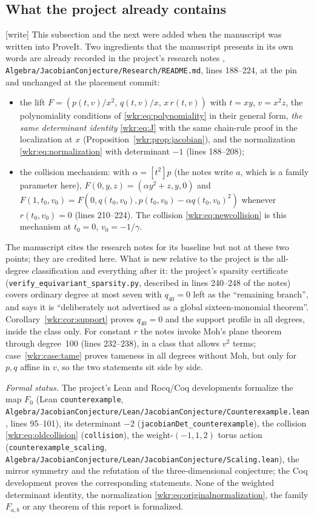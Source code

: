 \documentclass[11pt,a4paper]{article}
\numberwithin{equation}{section}
\theoremstyle{definition}
\theoremstyle{remark}
\newcommand{\wtag}{\textup{[write]}}%
\newcommand{\rpath}[1]{\nolinkurl{#1}}
\begin{document}
\subsection{What the project already contains}\label{wkr:sub:project}
\wtag{} This subsection and the next were added when the manuscript was
written into ProveIt. Two ingredients that the manuscript presents in its
own words are already recorded in the project's research notes
\cite{repo-research}, \rpath{Algebra/JacobianConjecture/Research/README.md},
lines 188--224, at the pin and unchanged at the placement commit:
\begin{itemize}
\item the lift $F=(p(t,v)/x^2,\,q(t,v)/x,\,x\,r(t,v))$ with $t=xy$,
$v=x^2z$, the polynomiality conditions of \eqref{wkr:eq:polynomiality}
in their general form, \emph{the same determinant identity}
\eqref{wkr:eq:J} with the same chain-rule proof in the localization at
$x$ (Proposition~\ref{wkr:prop:jacobian}), and the normalization
\eqref{wkr:eq:normalization} with determinant $-1$ (lines 188--208);
\item the collision mechanism: with $\alpha=[t^2]p$ (the notes write $a$,
which is a family parameter here), $F(0,y,z)=(\alpha y^2+z,y,0)$ and
$F(1,t_0,v_0)=F(0,q(t_0,v_0),p(t_0,v_0)-\alpha q(t_0,v_0)^2)$ whenever
$r(t_0,v_0)=0$ (lines 210--224). The collision \eqref{wkr:eq:newcollision}
is this mechanism at $t_0=0$, $v_0=-1/\gamma$.
\end{itemize}
The manuscript cites the research notes for its baseline but not at these
two points; they are credited here. What is new relative to the project is
the all-degree classification and everything after it: the project's
sparsity certificate (\rpath{verify_equivariant_sparsity.py}, described in
lines 240--248 of the notes) covers ordinary degree at most seven with $q_{40}=0$ left as
the ``remaining branch'', and says it is ``deliberately not advertised as a
global sixteen-monomial theorem''. Corollary~\ref{wkr:cor:support} proves
$q_{40}=0$ and the support profile in all degrees, inside the class only.
For constant $r$ the notes invoke Moh's plane theorem through degree~100
(lines 232--238), in a class that allows $v^2$ terms; case~\ref{wkr:case:tame}
proves tameness in all degrees without Moh, but only for $p,q$ affine in
$v$, so the two statements sit side by side.

\emph{Formal status.} The project's Lean and Rocq/Coq developments
formalize the map $F_0$ (Lean \texttt{counterexample},
\rpath{Algebra/JacobianConjecture/Lean/JacobianConjecture/Counterexample.lean},
lines 95--101), its determinant $-2$ (\texttt{jacobianDet\_counterexample}),
the collision \eqref{wkr:eq:oldcollision} (\texttt{collision}), the
weight-$(-1,1,2)$ torus action (\texttt{counterexample\_scaling},
\rpath{Algebra/JacobianConjecture/Lean/JacobianConjecture/Scaling.lean}), the mirror symmetry and the refutation of the
three-dimensional conjecture; the Coq development proves the
corresponding statements. None of the weighted determinant identity,
the normalization \eqref{wkr:eq:originalnormalization}, the family
$F_{a,b}$ or any theorem of this report is formalized.
\end{document}
